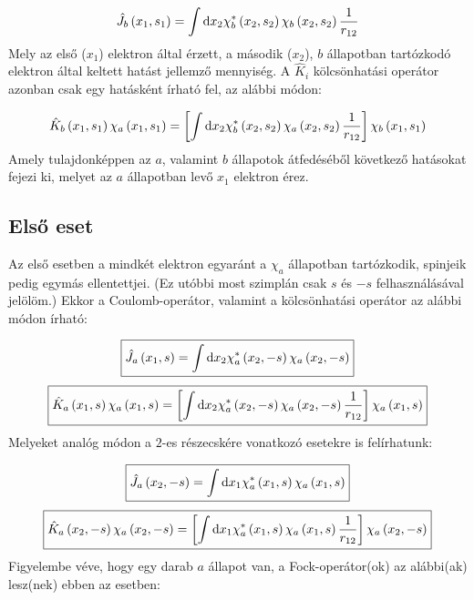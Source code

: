 \begin{equation} \label{eq:3}
	\hat{J}_{b} \left( x_{1}, s_{1} \right)
	=
	\int \operatorname{d}\!{x_{2}} \chi_{b}^{\ast} \left( x_{2}, s_{2} \right) \chi_{b} \left( x_{2}, s_{2} \right) \frac{1}{r_{12}}
\end{equation}
Mely az első ($x_{1}$) elektron által érzett, a második ($x_{2}$), $b$ állapotban tartózkodó elektron által keltett hatást jellemző mennyiség. A $\hat{K}_{i}$ kölcsönhatási operátor azonban csak egy hatásként írható fel, az alábbi módon:

\begin{equation} \label{eq:4}
	\hat{K}_{b} \left( x_{1}, s_{1} \right) \chi_{a} \left( x_{1}, s_{1} \right)
	=
	\left[
		\int \operatorname{d}\!{x_{2}} \chi_{b}^{\ast} \left( x_{2}, s_{2} \right) \chi_{a} \left( x_{2}, s_{2} \right) \frac{1}{r_{12}}
	\right]
	\chi_{b} \left( x_{1}, s_{1} \right)
\end{equation}
Amely tulajdonképpen az $a$, valamint $b$ állapotok átfedéséből következő hatásokat fejezi ki, melyet az $a$ állapotban levő $x_{1}$ elektron érez.

\subsection*{Első eset}
Az első esetben a mindkét elektron egyaránt a $\chi_{a}$ állapotban tartózkodik, spinjeik pedig egymás ellentettjei. (Ez utóbbi most szimplán csak $s$ és $-s$ felhasználásával jelölöm.) Ekkor a Coulomb-operátor, valamint a kölcsönhatási operátor az alábbi módon írható:

\begin{equation} \label{eq:5}
	\boxed{
	\hat{J}_{a} \left( x_{1}, s \right)
	=
	\int \operatorname{d}\!{x_{2}} \chi_{a}^{\ast} \left( x_{2}, -s \right) \chi_{a} \left( x_{2}, -s \right)
	}
\end{equation}
\begin{equation} \label{eq:6}
	\boxed{
	\hat{K}_{a} \left( x_{1}, s \right) \chi_{a} \left( x_{1}, s \right)
	=
	\left[
		\int \operatorname{d}\!{x_{2}} \chi_{a}^{\ast} \left( x_{2}, -s \right) \chi_{a} \left( x_{2}, -s \right) \frac{1}{r_{12}}
	\right]
	\chi_{a} \left( x_{1}, s \right)
	}
\end{equation}
Melyeket analóg módon a $2$-es részecskére vonatkozó esetekre is felírhatunk:

\begin{equation} \label{eq:7}
	\boxed{
	\hat{J}_{a} \left( x_{2}, -s \right)
	=
	\int \operatorname{d}\!{x_{1}} \chi_{a}^{\ast} \left( x_{1}, s \right) \chi_{a} \left( x_{1}, s \right)
	}
\end{equation}
\begin{equation} \label{eq:8}
	\boxed{
	\hat{K}_{a} \left( x_{2}, -s \right) \chi_{a} \left( x_{2}, -s \right)
	=
	\left[
		\int \operatorname{d}\!{x_{1}} \chi_{a}^{\ast} \left( x_{1}, s \right) \chi_{a} \left( x_{1}, s \right) \frac{1}{r_{12}}
	\right]
	\chi_{a} \left( x_{2}, -s \right)
	}
\end{equation}
Figyelembe véve, hogy egy darab $a$ állapot van, a Fock-operátor(ok) az alábbi(ak) lesz(nek) ebben az esetben:

